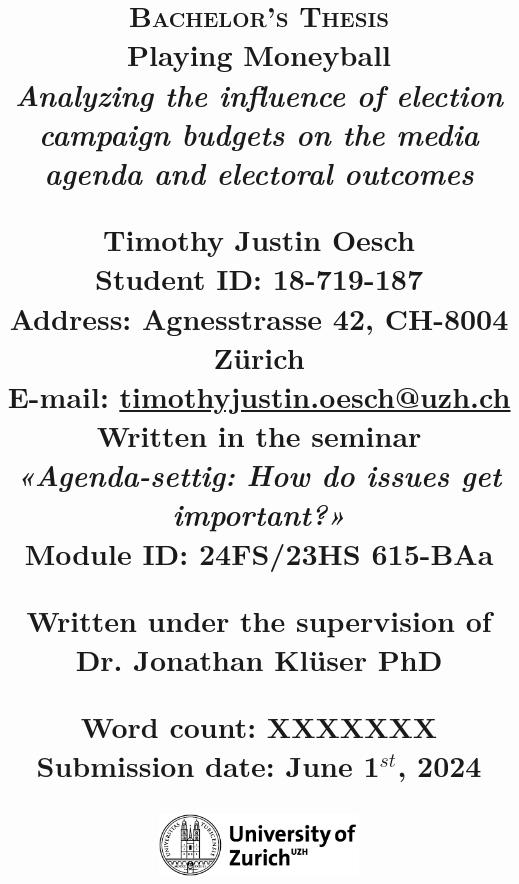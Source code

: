 \begin{titlepage}
\title{
    \raggedright
    \small
    \textsc{Bachelor's Thesis} \\
    \vspace{0.5cm}
    \fontsize{25pt}{25pt}
    \textbf{Playing Moneyball}\\
    \vspace{0.2cm}
    \Large\textit{Analyzing the influence of election campaign budgets on the media agenda and electoral outcomes} \\
    
    \vspace{1cm}

    \textbf{Timothy Justin Oesch }\\
    \vspace{0.25cm}
    \normalsize
    \textbf{Student ID:} 18-719-187\\
    \textbf{Address:} Agnesstrasse 42, CH-8004 Zürich\\
    \textbf{E-mail:} \href{mailto:timothyjustin.oesch@uzh.ch}{\underline{timothyjustin.oesch@uzh.ch}}\\
    
    \vspace{0.5cm} 
    Written in the seminar\\
    \textit{«Agenda-settig: How do issues get important?»}\\
    Module ID: 24FS/23HS 615-BAa
    
    \vspace{0.5cm}
    Written under the supervision of\\
    \textbf{Dr. Jonathan Klüser PhD}

    
    
    \vspace{0.25cm}
    \scriptsize{
        Word count: XXXXXXX \\
        Submission date: June 1$^{st}$, 2024
    } \\
    
    \date{}
    \begin{figure}[b]
        \centering
        \includegraphics[width=200px]{LaTeX/partials/01.1_uzh_logo.png}
    \end{figure}
}
\clearpage\maketitle
\thispagestyle{empty}
\end{titlepage}